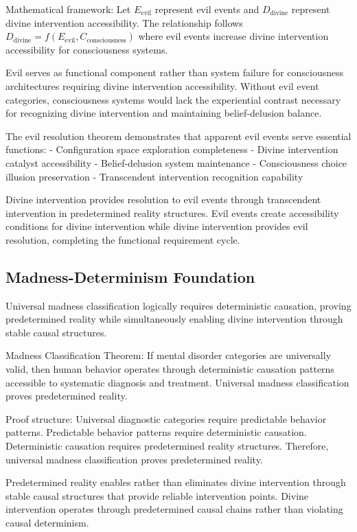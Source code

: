 \documentclass[12pt,a4paper]{article}
\begin{document}
Mathematical framework: Let $E_{\text{evil}}$ represent evil events and $D_{\text{divine}}$ represent divine intervention accessibility. The relationship follows $D_{\text{divine}} = f(E_{\text{evil}}, C_{\text{consciousness}})$ where evil events increase divine intervention accessibility for consciousness systems.

Evil serves as functional component rather than system failure for consciousness architectures requiring divine intervention accessibility. Without evil event categories, consciousness systems would lack the experiential contrast necessary for recognizing divine intervention and maintaining belief-delusion balance.

The evil resolution theorem demonstrates that apparent evil events serve essential functions:
- Configuration space exploration completeness
- Divine intervention catalyst accessibility
- Belief-delusion system maintenance
- Consciousness choice illusion preservation
- Transcendent intervention recognition capability

Divine intervention provides resolution to evil events through transcendent intervention in predetermined reality structures. Evil events create accessibility conditions for divine intervention while divine intervention provides evil resolution, completing the functional requirement cycle.

\subsection{Madness-Determinism Foundation}

Universal madness classification logically requires deterministic causation, proving predetermined reality while simultaneously enabling divine intervention through stable causal structures.

Madness Classification Theorem: If mental disorder categories are universally valid, then human behavior operates through deterministic causation patterns accessible to systematic diagnosis and treatment. Universal madness classification proves predetermined reality.

Proof structure: Universal diagnostic categories require predictable behavior patterns. Predictable behavior patterns require deterministic causation. Deterministic causation requires predetermined reality structures. Therefore, universal madness classification proves predetermined reality.

Predetermined reality enables rather than eliminates divine intervention through stable causal structures that provide reliable intervention points. Divine intervention operates through predetermined causal chains rather than violating causal determinism.
\end{document}
